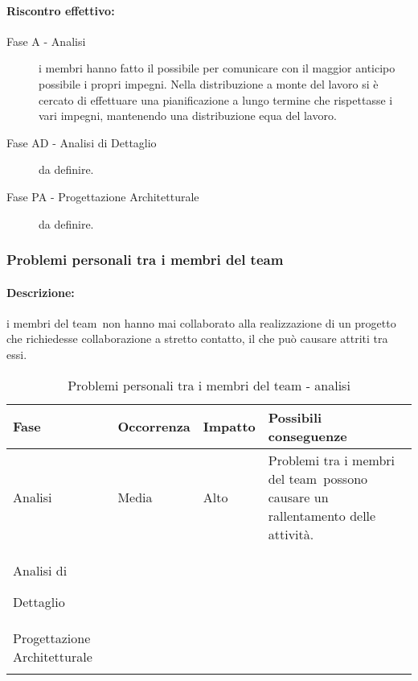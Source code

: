 \documentclass[../PianoProgetto.tex]{subfiles}
\begin{document}
	\paragraph*{Riscontro effettivo:}
		\begin{description}
			\item[Fase A - Analisi] i membri hanno fatto il possibile per comunicare con il maggior anticipo possibile i propri impegni. Nella distribuzione a monte del lavoro si è cercato di effettuare una pianificazione a lungo termine che rispettasse i vari impegni, mantenendo una distribuzione equa del lavoro.
			\item[Fase AD - Analisi di Dettaglio] da definire.
			\item[Fase PA - Progettazione Architetturale] da definire.
		\end{description}
	
\subsubsection{Problemi personali tra i membri del team}

	\paragraph*{Descrizione:} i membri del team\g\ non hanno mai collaborato alla realizzazione di un progetto che richiedesse collaborazione a stretto contatto, il che può causare attriti tra essi.
	
	
	\begin{table}[h]
		\centering
		\begin{tabularx}{\textwidth}{F O O P}
			\toprule
			\textbf{Fase} & \textbf{Occorrenza} & \textbf{Impatto} & \textbf{Possibili conseguenze}\\
			\midrule
			Analisi & Media & Alto & Problemi tra i membri del team\g\ possono causare un rallentamento delle attività. \\
			\midrule
			Analisi di \par Dettaglio & & & \\
			\midrule
			Progettazione Architetturale & & & \\
			\bottomrule
		\end{tabularx}
		\caption{Problemi personali tra i membri del team - analisi}
		\label{tab:Problemi personali tra i membri del team - analisi}	
	\end{table}
	
\end{document}

